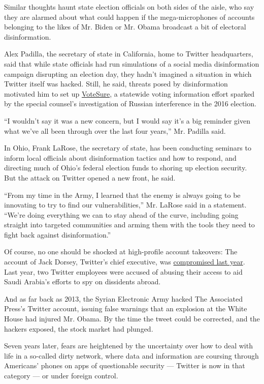 Similar thoughts haunt state election officials on both sides of the
aisle, who say they are alarmed about what could happen if the
mega-microphones of accounts belonging to the likes of Mr. Biden or Mr.
Obama broadcast a bit of electoral disinformation.

Alex Padilla, the secretary of state in California, home to Twitter
headquarters, said that while state officials had run simulations of a
social media disinformation campaign disrupting an election day, they
hadn't imagined a situation in which Twitter itself was hacked. Still,
he said, threats posed by disinformation motivated him to set up
\href{https://www.sos.ca.gov/elections/vote-sure/}{VoteSure}, a
statewide voting information effort sparked by the special counsel's
investigation of Russian interference in the 2016 election.

``I wouldn't say it was a new concern, but I would say it's a big
reminder given what we've all been through over the last four years,''
Mr. Padilla said.

In Ohio, Frank LaRose, the secretary of state, has been conducting
seminars to inform local officials about disinformation tactics and how
to respond, and directing much of Ohio's federal election funds to
shoring up election security. But the attack on Twitter opened a new
front, he said.

``From my time in the Army, I learned that the enemy is always going to
be innovating to try to find our vulnerabilities,'' Mr. LaRose said in a
statement. ``We're doing everything we can to stay ahead of the curve,
including going straight into targeted communities and arming them with
the tools they need to fight back against disinformation.''

Of course, no one should be shocked at high-profile account takeovers:
The account of Jack Dorsey, Twitter's chief executive, was
\href{https://www.nytimes.com/2019/08/30/technology/jack-dorsey-twitter-account-hacked.html}{compromised
last year}. Last year, two Twitter employees were accused of abusing
their access to aid Saudi Arabia's efforts to spy on dissidents abroad.

And as far back as 2013, the Syrian Electronic Army hacked The
Associated Press's Twitter account, issuing false warnings that an
explosion at the White House had injured Mr. Obama. By the time the
tweet could be corrected, and the hackers exposed, the stock market had
plunged.

Seven years later, fears are heightened by the uncertainty over how to
deal with life in a so-called dirty network, where data and information
are coursing through Americans' phones on apps of questionable security
--- Twitter is now in that category --- or under foreign control.

